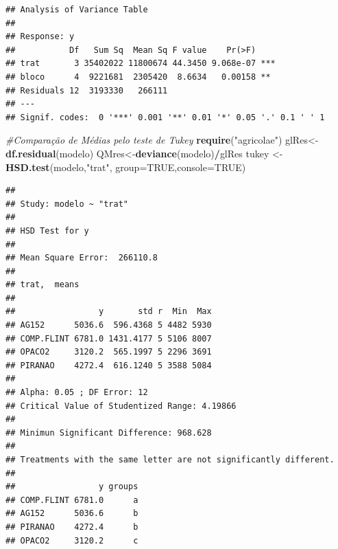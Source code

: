 \documentclass[
]{book}
\newenvironment{Shaded}{\begin{snugshade}}{\end{snugshade}}
\newcommand{\CommentTok}[1]{\textcolor[rgb]{0.56,0.35,0.01}{\textit{#1}}}
\newcommand{\DataTypeTok}[1]{\textcolor[rgb]{0.13,0.29,0.53}{#1}}
\newcommand{\DecValTok}[1]{\textcolor[rgb]{0.00,0.00,0.81}{#1}}
\newcommand{\FloatTok}[1]{\textcolor[rgb]{0.00,0.00,0.81}{#1}}
\newcommand{\KeywordTok}[1]{\textcolor[rgb]{0.13,0.29,0.53}{\textbf{#1}}}
\newcommand{\NormalTok}[1]{#1}
\newcommand{\OperatorTok}[1]{\textcolor[rgb]{0.81,0.36,0.00}{\textbf{#1}}}
\newcommand{\OtherTok}[1]{\textcolor[rgb]{0.56,0.35,0.01}{#1}}
\newcommand{\StringTok}[1]{\textcolor[rgb]{0.31,0.60,0.02}{#1}}
\begin{document}
\begin{verbatim}
## Analysis of Variance Table
## 
## Response: y
##           Df   Sum Sq  Mean Sq F value    Pr(>F)    
## trat       3 35402022 11800674 44.3450 9.068e-07 ***
## bloco      4  9221681  2305420  8.6634   0.00158 ** 
## Residuals 12  3193330   266111                      
## ---
## Signif. codes:  0 '***' 0.001 '**' 0.01 '*' 0.05 '.' 0.1 ' ' 1
\end{verbatim}

\begin{Shaded}
\begin{Highlighting}[]
\CommentTok{#Comparação de Médias pelo teste de Tukey}
\KeywordTok{require}\NormalTok{(}\StringTok{"agricolae"}\NormalTok{)}
\NormalTok{glRes<-}\KeywordTok{df.residual}\NormalTok{(modelo)}
\NormalTok{QMres<-}\KeywordTok{deviance}\NormalTok{(modelo)}\OperatorTok{/}\NormalTok{glRes}
\NormalTok{tukey <-}\StringTok{ }\KeywordTok{HSD.test}\NormalTok{(modelo,}\StringTok{"trat"}\NormalTok{, }\DataTypeTok{group=}\OtherTok{TRUE}\NormalTok{,}\DataTypeTok{console=}\OtherTok{TRUE}\NormalTok{)}
\end{Highlighting}
\end{Shaded}

\begin{verbatim}
## 
## Study: modelo ~ "trat"
## 
## HSD Test for y 
## 
## Mean Square Error:  266110.8 
## 
## trat,  means
## 
##                 y       std r  Min  Max
## AG152      5036.6  596.4368 5 4482 5930
## COMP.FLINT 6781.0 1431.4177 5 5106 8007
## OPACO2     3120.2  565.1997 5 2296 3691
## PIRANAO    4272.4  616.1240 5 3588 5084
## 
## Alpha: 0.05 ; DF Error: 12 
## Critical Value of Studentized Range: 4.19866 
## 
## Minimun Significant Difference: 968.628 
## 
## Treatments with the same letter are not significantly different.
## 
##                 y groups
## COMP.FLINT 6781.0      a
## AG152      5036.6      b
## PIRANAO    4272.4      b
## OPACO2     3120.2      c
\end{verbatim}

\begin{Shaded}
\end{Shaded}
\end{document}
